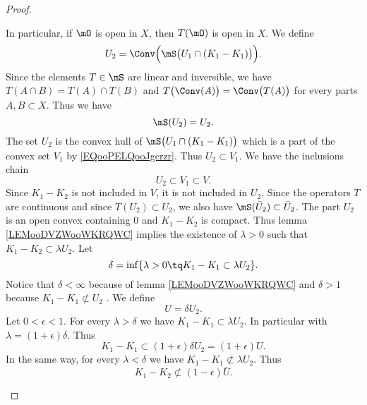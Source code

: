 \begin{proof}
\begin{subproof}
		In particular, if \( \mO\) is open in \( X\), then \( T(\mO)\) is open in \( X\).
		\spitem[Définition of \( U_2\)]
		We define
		\begin{equation}
			U_2=\Conv\Big( \mS\big(  U_1\cap(K_1-K_1)  \big) \Big).
		\end{equation}
		Since the elements \( T\in \mS\) are linear and inversible, we have \( T(A\cap B)=T(A)\cap T(B)\) and \( T\big( \Conv(A) \big)=\Conv\big( T(A) \big)\) for every parts \( A,B\subset X\). Thus we have
		\begin{equation}
			\mS(U_2)=U_2.
		\end{equation}
		\spitem[\( K_1-K_1\subsetneq U_2\)]
		The set \( U_2\) is the convex hull of \( \mS\big( U_1\cap (K_1-K_1) \big)\) which is a part of the convex set \( V_1\) by \eqref{EQooPELQooJgcrzr}. Thus \( U_2\subset V_1\). We have the inclusions chain
		\begin{equation}
			U_2\subset V_1\subset V.
		\end{equation}
		Since \( K_1-K_2\) is not included in \( V\), it is not included in \( U_2\).
		\spitem[Definition of \( U\)]
		Since the operators \( T\) are continuous and since \( T(U_2)\subset U_2\), we also have \( \mS(\bar U_2)\subset \bar U_2\). The part \( U_2 \) is an open convex containing \( 0\) and \( K_1-K_2\) is compact. Thus lemma \ref{LEMooDVZWooWKRQWC} implies the existence of \( \lambda>0\) such that \( K_1-K_2 \subset \lambda U_2\). Let
		\begin{equation}
			\delta=\inf\{ \lambda>0\tq K_1-K_1\subset \lambda U_2 \}.
		\end{equation}
		Notice that \( \delta<\infty\) because of lemma \ref{LEMooDVZWooWKRQWC} and \( \delta >1\) because \( K_1-K_1\nsubset U_2\) . We define
		\begin{equation}
			U=\delta U_2.
		\end{equation}
		Let \(   0<\epsilon<1   \). For every \( \lambda>\delta\) we have \( K_1-K_1\subset \lambda U_2\). In particular with \( \lambda= (1+\epsilon)\delta\). Thus
		\begin{equation}
			K_1-K_1\subset (1+\epsilon)\delta U_2=(1+\epsilon)U.
		\end{equation}
		In the same way, for every \( \lambda<\delta\) we have \( K_1-K_1\nsubset \lambda U_2\). Thus
		\begin{equation}        \label{EQooNYNTooQScVJL}
			K_1-K_2\nsubset (1-\epsilon)\bar U.
		\end{equation}


\end{subproof}
\end{proof}
